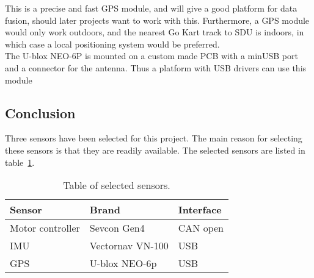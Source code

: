 This is a precise and fast GPS module, and will give a good platform for data fusion, should later projects want to work with this.
Furthermore, a GPS module would only work outdoors, and the nearest Go Kart track to SDU is indoors, in which case a local positioning system would be preferred.\\

The U-blox NEO-6P is mounted on a custom made PCB with a minUSB port and a connector for the antenna. 
Thus a platform with USB drivers can use this module

\subsection{Conclusion}
Three sensors have been selected for this project. 
The main reason for selecting these sensors is that they are readily available.
The selected sensors are listed in table~\ref{tab:sensor_conclusion}.

\begin{table}[H]
	\centering
	\caption{Table of selected sensors.}
	\label{tab:sensor_conclusion}
	\begin{tabular}{|l|l|l|}
		\hline
		\textbf{Sensor} & \textbf{Brand} & \textbf{Interface} \\
		\hline
		Motor controller & Sevcon Gen4 & CAN open \\ 
		\hline
		IMU & Vectornav VN-100 & USB\\
		\hline
		GPS & U-blox NEO-6p & USB\\
		\hline
	\end{tabular}
\end{table}
